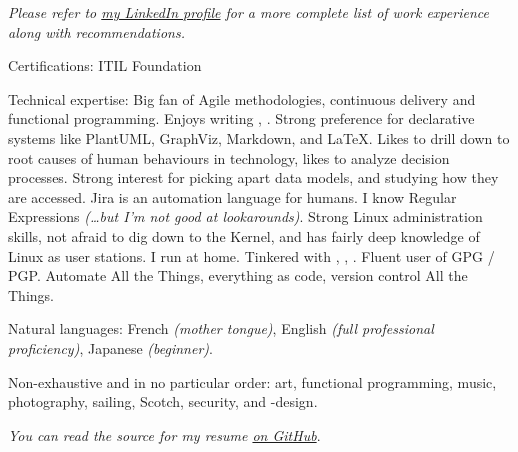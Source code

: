 \documentclass[10pt,letterpaper]{article}
\begin{document}
\begin{center}
  \emph{\small Please refer to \href{https://www.linkedin.com/in/alexis-vanier-94705463/}{my LinkedIn profile} for a more complete list of work experience along with recommendations.}
\end{center}

\spacedhrule{-0.2em}{-0.4em}


\inlineheadsection  %
  {Certifications:}
  {\bull ITIL Foundation}

\inlineheadsection  %
  {Technical expertise:}
  {Big fan of Agile methodologies, continuous delivery and functional programming. Enjoys writing , . Strong preference for declarative systems like PlantUML, GraphViz, Markdown, and \LaTeX. Likes to drill down to root causes of human behaviours in technology, likes to analyze decision processes. Strong interest for picking apart data models, and studying how they are accessed. Jira is an automation language for humans. I know Regular Expressions \emph{\small{(\ldots but I'm not good at lookarounds)}}. Strong Linux administration skills, not afraid to dig down to the Kernel, and has fairly deep knowledge of Linux as user stations. I run  at home. Tinkered with , , . Fluent user of GPG / PGP. Automate All the Things, everything as code, version control All the Things.}

\vspace{0.5em}
\inlineheadsection
  {Natural languages:}
  {French \emph{(mother tongue)}, English \emph{(full professional proficiency)}, Japanese \emph{(beginner)}.}


\spacedhrule{1.6em}{-0.4em}


\inlineheadsection
  {Non-exhaustive and in no particular order:}
  {art, functional programming, music, photography, sailing, Scotch, security, and -design.}

\vspace{1em}
\begin{center}
  \emph{\small You can read the source for my resume \href{https://github.com/avanier/latex-resume/blob/master/alexis-vanier-resume.tex}{on GitHub}}.
\end{center}
\end{document}
